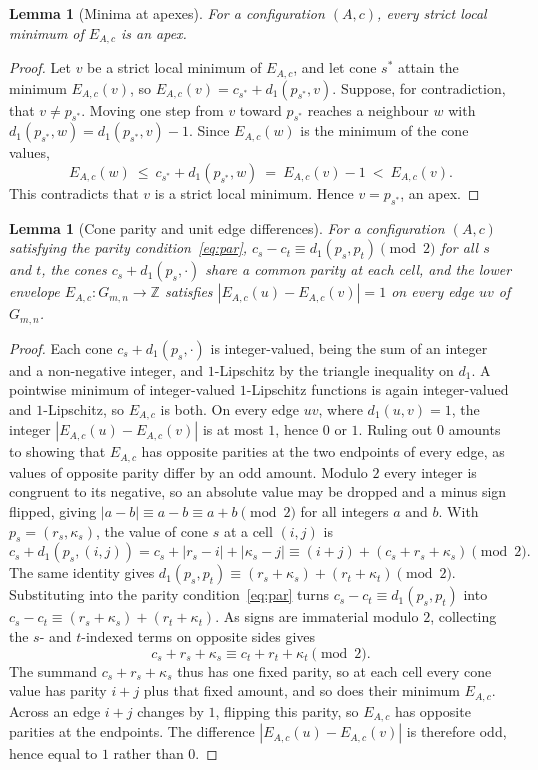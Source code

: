 \documentclass[11pt]{article}
\newtheorem{lemma}[theorem]{Lemma}
\theoremstyle{definition}
\theoremstyle{remark}
\newcommand{\dgrid}{d_1}
\newcommand{\Z}{\mathbb{Z}}
\newcommand{\Gmn}{G_{m,n}}
\begin{document}
\begin{lemma}[Minima at apexes]\label{lem:minatapex}
For a configuration $(A,c)$, every strict local minimum of $E_{A,c}$ is
an apex.
\end{lemma}

\begin{proof}
Let $v$ be a strict local minimum of $E_{A,c}$, and let cone $s^\ast$
attain the minimum $E_{A,c}(v)$, so
$E_{A,c}(v)=c_{s^\ast}+\dgrid(p_{s^\ast},v)$. Suppose, for contradiction,
that $v\ne p_{s^\ast}$. Moving one step from $v$ toward $p_{s^\ast}$
reaches a neighbour $w$ with $\dgrid(p_{s^\ast},w)=\dgrid(p_{s^\ast},v)-1$.
Since $E_{A,c}(w)$ is the minimum of the cone values,
\[
  E_{A,c}(w) \ \le\ c_{s^\ast}+\dgrid(p_{s^\ast},w) \ =\ E_{A,c}(v)-1 \ <\ E_{A,c}(v) .
\]
This contradicts that $v$ is a strict local minimum. Hence
$v=p_{s^\ast}$, an apex.
\end{proof}

\begin{lemma}[Cone parity and unit edge differences]\label{lem:parityvalid}
For a configuration $(A,c)$ satisfying the parity
condition~\eqref{eq:par}, $c_s-c_t\equiv\dgrid(p_s,p_t)\pmod 2$ for all
$s$ and $t$, the cones $c_s+\dgrid(p_s,\cdot)$ share a common parity at
each cell, and the lower envelope $E_{A,c}\colon\Gmn\to\Z$ satisfies
$|E_{A,c}(u)-E_{A,c}(v)|=1$ on every edge $uv$ of $\Gmn$.
\end{lemma}

\begin{proof}
Each cone $c_s+\dgrid(p_s,\cdot)$ is integer-valued, being the sum of an
integer and a non-negative integer, and $1$-Lipschitz by the triangle
inequality on $\dgrid$. A pointwise minimum of integer-valued
$1$-Lipschitz functions is again integer-valued and $1$-Lipschitz, so
$E_{A,c}$ is both. On every edge $uv$, where
$\dgrid(u,v)=1$, the integer $|E_{A,c}(u)-E_{A,c}(v)|$ is at most $1$,
hence $0$ or $1$. Ruling out $0$ amounts to showing that $E_{A,c}$ has
opposite parities at the two endpoints of every edge, as values of
opposite parity differ by an odd amount. Modulo $2$ every integer is
congruent to its negative, so an absolute value may be dropped and a
minus sign flipped, giving $|a-b|\equiv a-b\equiv a+b\pmod 2$ for all integers
$a$ and $b$. With $p_s=(r_s,\kappa_s)$, the value of cone
$s$ at a cell $(i,j)$ is
\[
  c_s+\dgrid(p_s,(i,j))=c_s+|r_s-i|+|\kappa_s-j|
    \equiv(i+j)+(c_s+r_s+\kappa_s)\pmod 2 .
\]
The same identity gives
$\dgrid(p_s,p_t)\equiv(r_s+\kappa_s)+(r_t+\kappa_t)\pmod 2$. Substituting into
the parity condition~\eqref{eq:par} turns $c_s-c_t\equiv\dgrid(p_s,p_t)$ into
$c_s-c_t\equiv(r_s+\kappa_s)+(r_t+\kappa_t)$. As signs are immaterial
modulo $2$, collecting the $s$- and $t$-indexed terms on opposite sides
gives
\[
  c_s+r_s+\kappa_s\equiv c_t+r_t+\kappa_t\pmod 2 .
\]
The summand $c_s+r_s+\kappa_s$ thus has one fixed parity, so at each cell
every cone value has parity $i+j$ plus that fixed amount, and so does
their minimum $E_{A,c}$. Across an edge $i+j$ changes by $1$, flipping
this parity, so $E_{A,c}$ has opposite parities at the endpoints. The
difference $|E_{A,c}(u)-E_{A,c}(v)|$ is therefore odd, hence equal to $1$
rather than $0$.
\end{proof}
\end{document}

